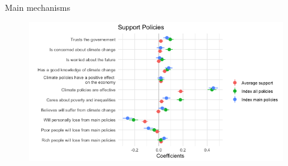 \begin{framefont}{\small}
\begin{frame}{Main mechanisms}
\begin{figure}
	\includegraphics[width=.9\paperwidth]{../figures/FR/reg_support_policies_ABC_FR.png}
\end{figure}
\end{frame}


\end{framefont}
